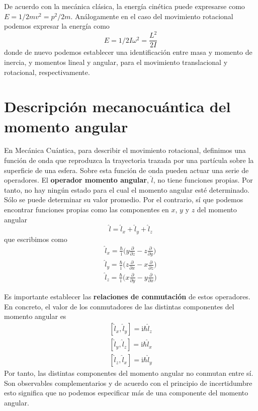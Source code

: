 De acuerdo con la mecánica clásica, la energía cinética 
puede expresarse como $E=1/2mv^2=p^2/2m$. Análogamente en 
el caso del movimiento rotacional podemos expresar la 
energía como 
\begin{equation}
    E=1/2I\omega^2=\frac{L^2}{2I}\label{eq:classicrote}
\end{equation}
donde de nuevo podemos establecer una identificación 
entre masa y momento de inercia, y momentos lineal y
angular, para el movimiento translacional y rotacional,
respectivamente.

\section{Descripción mecanocuántica del momento angular}
En Mecánica Cuántica, para describir el movimiento 
rotacional, definimos una función de onda que reproduzca 
la trayectoria trazada por una partícula sobre la superficie
de una esfera. Sobre esta función de onda pueden actuar
una serie de operadores. El \textbf{operador momento
angular}, $\hat{l}$, no tiene funciones propias. Por tanto,
no hay ningún estado para el cual el momento angular 
esté determinado. Sólo se puede determinar su valor
promedio. Por el contrario, sí que podemos encontrar
funciones propias como las componentes en $x$, $y$ y
$z$ del momento angular
\begin{equation}
\hat{l}=\hat{l}_x+\hat{l}_y+\hat{l}_z
\end{equation}
que escribimos como
\begin{subequations}
    \begin{align}
\hat{l}_x = 
\frac{\hbar}{\mathrm{i}}\bigg(y\frac{\partial}{\partial z} 
- z\frac{\partial}{\partial y}\bigg) \\
\hat{l}_y = 
\frac{\hbar}{\mathrm{i}}\bigg(z\frac{\partial}{\partial x}
-  x\frac{\partial}{\partial z}\bigg) \\
\hat{l}_z = 
\frac{\hbar}{\mathrm{i}}\bigg(x\frac{\partial}{\partial y} 
- y\frac{\partial}{\partial x}\bigg) 
\end{align}
\end{subequations}

Es importante establecer las \textbf{relaciones de
conmutación} de estos operadores. En concreto, el valor 
de los conmutadores de las distintas componentes del 
momento angular es 
\begin{subequations}
    \begin{align}
        [\hat{l}_x,\hat{l}_y] = \mathrm{i}\hbar \hat{l}_z\\
        [\hat{l}_y,\hat{l}_z] = \mathrm{i}\hbar \hat{l}_x\\
        [\hat{l}_z,\hat{l}_x] = \mathrm{i}\hbar \hat{l}_y
    \end{align}
\end{subequations}
Por tanto, las distintas componentes del momento angular no
conmutan entre sí. Son observables complementarios y
de acuerdo con el principio de incertidumbre esto significa
que no podemos especificar más de una componente del momento
angular.

